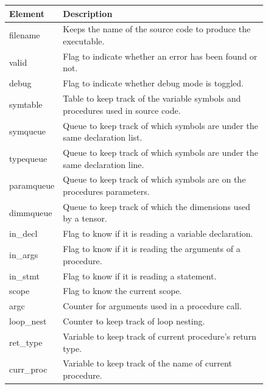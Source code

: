 \begin{figure}[H]
    \centering
    \begin{tabular}{p{1in}p{3in}}
        \toprule
        \textbf{Element} & \textbf{Description}\\
        \midrule filename &
        Keeps the name of the source code to produce the executable.\\

        \midrule valid &
        Flag to indicate whether an error has been found or not.\\

        \midrule debug &
        Flag to indicate whether debug mode is toggled.\\

        \midrule symtable &
        Table to keep track of the variable symbols and procedures used in
        source code.\\

        \midrule symqueue &
        Queue to keep track of which symbols are under the same declaration list.\\

        \midrule typequeue &
        Queue to keep track of which symbols are under the same declaration line.\\

        \midrule paramqueue &
        Queue to keep track of which symbols are on the procedures parameters.\\

        \midrule dimmqueue &
        Queue to keep track of which the dimensions used by a tensor.\\

        \midrule in\_decl &
        Flag to know if it is reading a variable declaration.\\

        \midrule in\_args &
        Flag to know if it is reading the arguments of a procedure.\\

        \midrule in\_stmt &
        Flag to know if it is reading a statement.\\

        \midrule scope &
        Flag to know the current scope.\\

        \midrule argc &
        Counter for arguments used in a procedure call.\\

        \midrule loop\_nest &
        Counter to keep track of loop nesting.\\

        \midrule ret\_type &
        Variable to keep track of current procedure's \newline return type.\\

        \midrule curr\_proc &
        Variable to keep track of the name of current \newline procedure.\\

        \bottomrule
    \end{tabular}\\
\end{figure}

